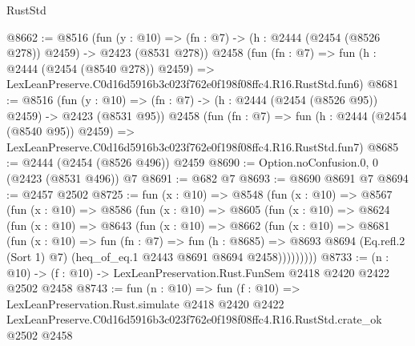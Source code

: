 \begin{lexlean}{RustStd}
\begin{coremodule}
@8662 := @8516
    (fun (y : @10) => (fn : @7) -> (h : @2444 (@2454 (@8526 @278)) @2459) -> @2423 (@8531 @278))
    @2458
    (fun (fn : @7) =>
    fun (h : @2444 (@2454 (@8540 @278)) @2459) =>
    LexLeanPreserve.C0d16d5916b3c023f762e0f198f08ffc4.R16.RustStd.fun6)
@8681 := @8516
    (fun (y : @10) => (fn : @7) -> (h : @2444 (@2454 (@8526 @95)) @2459) -> @2423 (@8531 @95))
    @2458
    (fun (fn : @7) =>
    fun (h : @2444 (@2454 (@8540 @95)) @2459) =>
    LexLeanPreserve.C0d16d5916b3c023f762e0f198f08ffc4.R16.RustStd.fun7)
@8685 := @2444 (@2454 (@8526 @496)) @2459
@8690 := Option.noConfusion.{0, 0} (@2423 (@8531 @496)) @7
@8691 := @682 @7
@8693 := @8690 @8691 @7
@8694 := @2457 @2502
@8725 := fun (x : @10) =>
  @8548
    (fun (x : @10) =>
    @8567
      (fun (x : @10) =>
      @8586
        (fun (x : @10) =>
        @8605
          (fun (x : @10) =>
          @8624
            (fun (x : @10) =>
            @8643
              (fun (x : @10) =>
              @8662
                (fun (x : @10) =>
                @8681
                  (fun (x : @10) =>
                  fun (fn : @7) =>
                  fun (h : @8685) =>
                  @8693
                    @8694
                    (Eq.refl.{2} (Sort 1) @7)
                    (heq_of_eq.{1} @2443 @8691 @8694 @2458)))))))))
@8733 := (n : @10) -> (f : @10) -> LexLeanPreservation.Rust.FunSem @2418 @2420 @2422 @2502 @2458
@8743 := fun (n : @10) =>
  fun (f : @10) =>
  LexLeanPreservation.Rust.simulate
    @2418
    @2420
    @2422
    LexLeanPreserve.C0d16d5916b3c023f762e0f198f08ffc4.R16.RustStd.crate_ok
    @2502
    @2458
\end{coremodule}
\end{lexlean}
